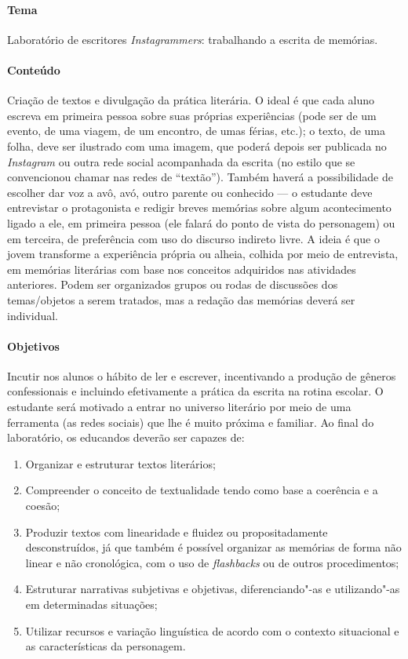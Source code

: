\documentclass[11pt]{extarticle}
\begin{document}
\paragraph{Tema} Laboratório de escritores \emph{Instagrammers}: trabalhando a escrita de memórias.

\paragraph{Conteúdo} Criação de textos e divulgação da prática literária.
O ideal é que cada aluno escreva em primeira pessoa sobre suas próprias
experiências (pode ser de um evento, de uma viagem, de um encontro, de
umas férias, etc.); o texto, de uma folha, deve ser ilustrado com uma
imagem, que poderá depois ser publicada no \emph{Instagram} ou outra
rede social acompanhada da escrita (no estilo que se convencionou chamar
nas redes de ``textão''). Também haverá a possibilidade de escolher dar
voz a avô, avó, outro parente ou conhecido --- o estudante deve
entrevistar o protagonista e redigir breves memórias sobre algum
acontecimento ligado a ele, em primeira pessoa (ele falará do ponto de
vista do personagem) ou em terceira, de preferência com uso do discurso
indireto livre. A ideia é que o jovem transforme a experiência própria
ou alheia, colhida por meio de entrevista, em memórias literárias com
base nos conceitos adquiridos nas atividades anteriores. Podem ser
organizados grupos ou rodas de discussões dos temas/objetos a serem
tratados, mas a redação das memórias deverá ser individual.

\paragraph{Objetivos}

Incutir nos alunos o hábito de ler e escrever,
incentivando a produção de gêneros confessionais e incluindo
efetivamente a prática da escrita na rotina escolar. O estudante será
motivado a entrar no universo literário por meio de uma ferramenta (as
redes sociais) que lhe é muito próxima e familiar. Ao final do
laboratório, os educandos deverão ser capazes de:

\begin{enumerate}
\item
Organizar e estruturar textos literários;

\item
Compreender o conceito de textualidade tendo como base a coerência e a
coesão;

\item
Produzir textos com linearidade e fluidez ou propositadamente
desconstruídos, já que também é possível organizar as memórias de forma
não linear e não cronológica, com o uso de \emph{flashbacks} ou de
outros procedimentos;

\item
Estruturar narrativas subjetivas e objetivas, diferenciando"-as e
utilizando"-as em determinadas situações;

\item
Utilizar recursos e variação linguística de acordo com o contexto
situacional e as características da personagem.
\end{enumerate}
\end{document}
